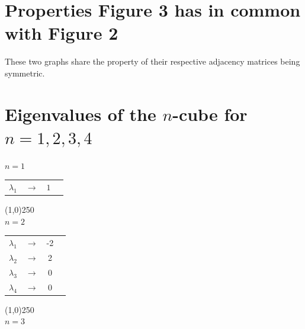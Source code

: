\documentclass[12pt]{scrreprt}
\begin{document}
\section{Properties Figure 3 has in common with Figure 2}

These two graphs share the property of their respective adjacency matrices being
symmetric.

\pagebreak

\section{Eigenvalues of the $n$-cube for $n=1,2,3,4$}

	\begin{center}
		$n = 1$
	\end{center}

	\vspace{.1 mm}

	\begin{center}
	\begin{tabular}{ c c c p{5cm} }
    $\lambda_1$ & $\rightarrow$ & $1$ \\
	\end{tabular}
	\end{center}

	\begin{center}
		\line(1,0){250}\\
		$n = 2$
	\end{center}

	\vspace{.1 mm}

  \begin{center}
  \begin{tabular}{ c c c p{5cm} }
    $\lambda_1$ & $\rightarrow$ & -2 \\        
    $\lambda_2$ & $\rightarrow$ & 2 \\
    $\lambda_3$ & $\rightarrow$ & 0 \\
    $\lambda_4$ & $\rightarrow$ & 0 \\
  \end{tabular}
  \end{center}

	\vspace{.1 mm}

	\begin{center}
		\line(1,0){250}\\
		$n = 3$
	\end{center}

	\vspace{.1 mm}
\end{document}
